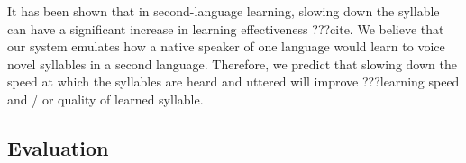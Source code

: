 It has been shown that in second-language learning,
slowing down the syllable can have
a significant increase in learning effectiveness
???cite.
We believe that our system emulates
how a native speaker of one language
would learn to voice novel syllables in a second language.
Therefore, we predict that slowing down
the speed at which the syllables are heard
and uttered will improve ???learning speed
and / or quality of learned syllable.

\subsection{Evaluation}
